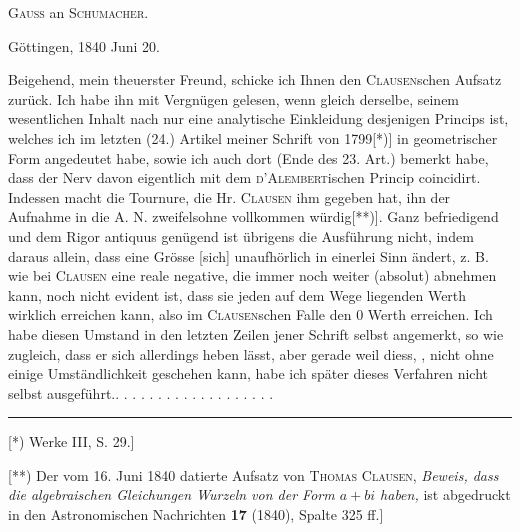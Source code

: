 \begin{center}\large\textsc{Gauss} an \textsc{Schumacher}.\end{center}
\begin{flushright}Göttingen, 1840 Juni 20.\end{flushright}
\noindent\hspace*{\parindent}Beigehend, mein theuerster Freund, schicke ich Ihnen den
\textsc{Clausen}schen Aufsatz zurück. Ich habe ihn mit Vergnügen gelesen, wenn gleich derselbe,
seinem wesentlichen Inhalt nach nur eine analytische Einkleidung desjenigen Princips ist,
welches ich im letzten (24.) Artikel meiner Schrift von 1799[*)] in geometrischer Form
angedeutet habe, sowie ich auch dort (Ende des 23. Art.) bemerkt habe, dass der Nerv davon
eigentlich mit dem \textsc{d’Alembert}ischen Princip coincidirt. Indessen macht die Tournure,
die Hr. \textsc{Clausen} ihm gegeben hat, ihn der Aufnahme in die A. N. zweifelsohne vollkommen
würdig[**)]. Ganz befriedigend und dem Rigor antiquus genügend ist übrigens die Ausführung
nicht, indem daraus allein, dass eine Grösse [sich] unaufhörlich in einerlei Sinn ändert,
z. B. wie bei \textsc{Clausen} eine reale negative, die immer noch weiter (absolut) abnehmen
kann, noch nicht evident ist, dass sie jeden auf dem Wege liegenden Werth wirklich erreichen
kann, also im \textsc{Clausen}schen Falle den 0 Werth erreichen. Ich habe diesen Umstand in
den letzten Zeilen jener Schrift selbst angemerkt, so wie zugleich, dass er sich allerdings
heben lässt, aber gerade weil diess, , nicht ohne
einige Umständlichkeit geschehen kann, habe ich später dieses Verfahren nicht selbst
ausgeführt.\quad . . . . . . . . . . . . . . . . . . .
\par\smallskip\noindent\rule{.25\linewidth}{.4pt}\par\smallskip
\begingroup\small
\noindent\hspace*{\parindent}[*) Werke III, S. 29.]\par
\noindent\hspace*{\parindent}[**) Der vom 16. Juni 1840 datierte Aufsatz von \textsc{Thomas Clausen},
\textit{Beweis, dass die algebraischen Gleichungen Wurzeln von der Form $a+bi$ haben,} ist
abgedruckt in den Astronomischen Nachrichten \textbf{17} (1840), Spalte 325 ff.]\par
\endgroup
\clearpage
